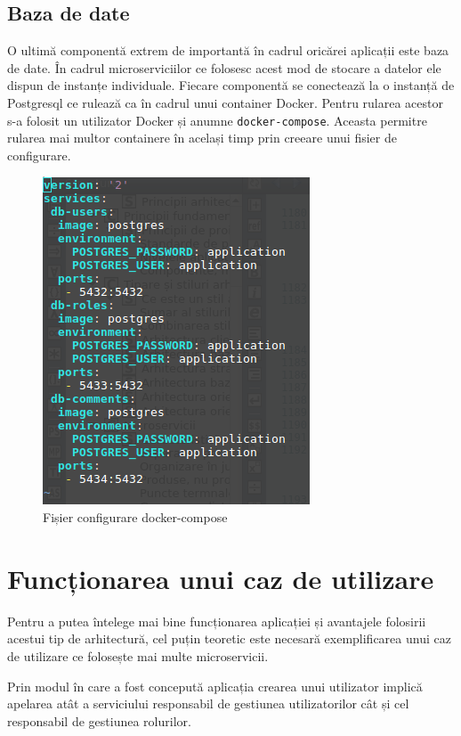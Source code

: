 \documentclass[12pt, a4paper, oneside, romanian]{teza-upb}
\begin{document}
\subsection{Baza de date}

O ultimă componentă extrem de importantă în cadrul oricărei aplicații este baza de date. În cadrul microserviciilor ce folosesc acest mod de stocare a datelor ele dispun de instanțe individuale. Fiecare componentă se conectează la o instanță de Postgresql ce rulează ca în cadrul unui container Docker. Pentru rularea acestor s-a folosit un utilizator Docker și anumne \texttt{docker-compose}. Aceasta permitre rularea mai multor containere în același timp prin creeare unui fisier de configurare.

\begin{figure}[ht]
\centering
\includegraphics[scale=0.5]{img/docker-compose.png}
\caption{Fișier configurare docker-compose}
\label{fig:arhi_componente}
\end{figure}

\newpage
\section{Funcționarea unui caz de utilizare}

Pentru a putea întelege mai bine funcționarea aplicației și avantajele folosirii acestui tip de arhitectură, cel puțin teoretic este necesară exemplificarea unui caz de utilizare ce folosește mai multe microservicii.

Prin modul în care a fost concepută aplicația crearea unui utilizator implică apelarea atât a serviciului responsabil de gestiunea utilizatorilor cât și cel responsabil de gestiunea rolurilor. 
\end{document}
